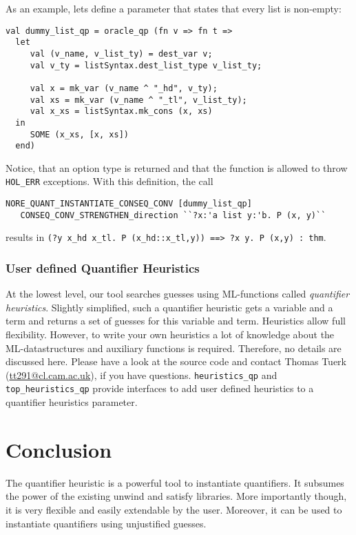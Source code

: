 \documentclass[a4paper,12pt,DIV=12,oneside]{scrbook}
\theoremstyle{definition}
\theoremstyle{remark}
\begin{document}
As an example, lets define a parameter that states that every list is non-empty:
{\scriptsize
\begin{verbatim}
val dummy_list_qp = oracle_qp (fn v => fn t =>
  let
     val (v_name, v_list_ty) = dest_var v;
     val v_ty = listSyntax.dest_list_type v_list_ty;

     val x = mk_var (v_name ^ "_hd", v_ty);
     val xs = mk_var (v_name ^ "_tl", v_list_ty);
     val x_xs = listSyntax.mk_cons (x, xs)
  in
     SOME (x_xs, [x, xs])
  end)
\end{verbatim}}

\noindent
Notice, that an option type is returned and that the function is
allowed to throw \texttt{HOL\_ERR} exceptions. 
With this definition, the call
\begin{verbatim}
NORE_QUANT_INSTANTIATE_CONSEQ_CONV [dummy_list_qp] 
   CONSEQ_CONV_STRENGTHEN_direction ``?x:'a list y:'b. P (x, y)``
\end{verbatim}
results in 
\verb+(?y x_hd x_tl. P (x_hd::x_tl,y)) ==> ?x y. P (x,y) : thm+. 

\subsection{User defined Quantifier Heuristics}\label{subsec_user_defined_quantheu}

At the lowest level, our tool searches guesses using ML-functions
called \emph{quantifier heuristics}. Slightly simplified, such a
quantifier heuristic gets a variable and a term and returns a set of
guesses for this variable and term. Heuristics allow full
flexibility. However, to write your own heuristics a lot of knowledge
about the ML-datastructures and auxiliary functions is
required. Therefore, no details are discussed here. Please have a look
at the source code and contact Thomas Tuerk
(\url{tt291@cl.cam.ac.uk}), if you have questions.
\texttt{heuristics\_qp} and \texttt{top\_heuristics\_qp} provide
interfaces to add user defined heuristics to a quantifier heuristics
parameter.


\chapter{Conclusion}\label{sec_conclusion}

The quantifier heuristic is a powerful tool to instantiate quantifiers. 
It subsumes the power of the existing unwind and satisfy libraries. More importantly though,
it is very flexible and easily extendable by the user. Moreover,
it can be used to instantiate quantifiers using unjustified guesses.



\end{document}

